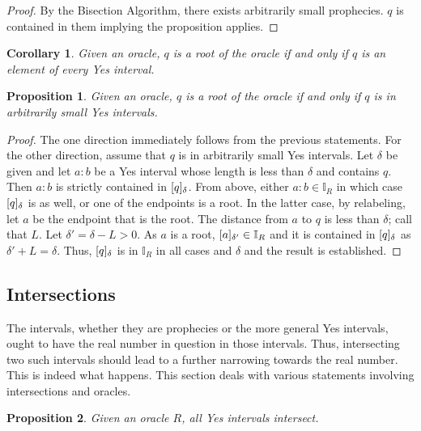 \documentclass[12pt]{article}
\newtheorem{corollary}{Corollary}[section]
\newtheorem{proposition}{Proposition}[section]
\begin{document}
\begin{proof}
    By the Bisection Algorithm, there exists arbitrarily small prophecies. $q$ is contained in them implying the proposition applies. 
\end{proof}



\begin{corollary}
    Given an oracle, $q$ is a root of the oracle if and only if $q$ is an element of every Yes interval. 
\end{corollary}

\begin{proposition}
    Given an oracle, $q$ is a root of the oracle if and only if $q$ is in arbitrarily small Yes intervals. 
\end{proposition}

\begin{proof}
   The one direction immediately follows from the previous statements. For the other direction, assume that $q$ is in arbitrarily small Yes intervals. Let $\delta$ be given and let $a:b$ be a Yes interval whose length is less than $\delta$ and contains $q$. Then $a:b$ is strictly contained in $\halo{q}$. From above, either $a:b \in \mathbb{I}_R$ in which case $\halo{q}$ is as well, or one of the endpoints is a root. In the latter case, by relabeling, let $a$ be the endpoint that is the root. The distance from $a$ to $q$ is less than $\delta$; call that $L$. Let $\delta' = \delta - L > 0$. As $a$ is a root, $\halo[\delta']{a} \in \mathbb{I}_R$ and it is contained in $\halo{q}$ as $\delta' + L = \delta$. Thus, $\halo{q}$ is in $\mathbb{I}_R$ in all cases and $\delta$ and the result is established. 
\end{proof}


\subsection{Intersections}

The intervals, whether they are prophecies or the more general Yes intervals, ought to have the real number in question in those intervals. Thus, intersecting two such intervals should lead to a further narrowing towards the real number. This is indeed what happens. This section deals with various statements involving intersections and oracles. 





\begin{proposition}\label{os:yesinter}
    Given an oracle $R$, all Yes intervals intersect. 
\end{proposition}
\end{document}
